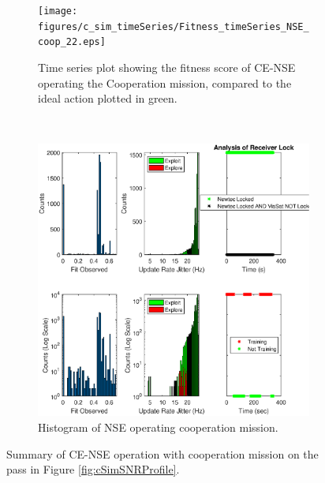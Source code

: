 \begin{figure}[ht]
\centering
\begin{subfigure}{\linewidth}
	\centering
	\texttt{[image: figures/c\_sim\_timeSeries/Fitness\_timeSeries\_NSE\_coop\_22.eps]}
	\caption{Time series plot showing the fitness score of CE-NSE operating the Cooperation mission, compared to the ideal action plotted in green.}
	\label{fig:cSimNSEOverview}
\end{subfigure}\\
\begin{subfigure}{\linewidth}
	\centering
	\includegraphics[scale=0.5]{figures/c_sim_results/sim22_NSE_hists_coop.eps}
	\caption{Histogram of NSE operating cooperation mission.}
	\label{fig:cSimNSEHists}
\end{subfigure}
\caption{Summary of CE-NSE operation with cooperation mission on the pass in Figure \ref{fig:cSimSNRProfile}.}
\label{fig:c22NSECoop}
\end{figure}
\clearpage

